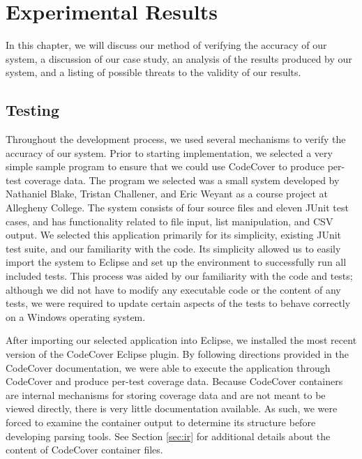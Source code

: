 %
%
%
\chapter{Experimental Results}\label{ch:results}

In this chapter, we will discuss our method of verifying the accuracy of our system,
a discussion of our case study, an analysis of the results produced by our system,
and a listing of possible threats to the validity of our results.

\section{Testing}\label{sec:test}

Throughout the development process, we used several mechanisms to verify the accuracy
of our system.  Prior to starting implementation, we selected a very simple sample
program to ensure that we could use CodeCover to produce per-test coverage data.  The
program we selected was a small system developed by Nathaniel Blake, Tristan Challener, 
and Eric Weyant as a course project at Allegheny College.  The system consists of four
source files and eleven JUnit test cases, and has functionality related to file input,
list manipulation, and CSV output.  We selected this application primarily for its
simplicity, existing JUnit test suite, and our familiarity with the code.  Its
simplicity allowed us to easily import the system to Eclipse and set up the environment
to successfully run all included tests.  This process was aided by our familiarity with
the code and tests; although we did not have to modify any executable code or the 
content of any tests, we were required to update certain aspects of the tests to behave
correctly on a Windows operating system.

After importing our selected application into Eclipse, we installed the most recent version
of the CodeCover Eclipse plugin.  By following directions provided in the CodeCover documentation,
we were able to execute the application through CodeCover and produce per-test coverage data.
Because CodeCover containers are internal mechanisms for storing coverage data and are not
meant to be viewed directly, there is very little documentation available.  As such, we were 
forced to examine the container output to determine its structure before developing parsing
tools.  See Section \ref{sec:ir} for additional details about the content of CodeCover
container files.

